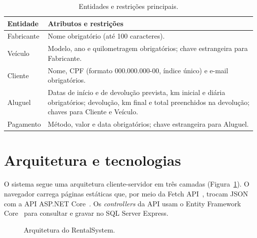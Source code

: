 \documentclass[12pt]{article}
\begin{document}
\begin{table}[htbp]
\centering
\caption{Entidades e restrições principais.}
\label{tab:entidades}
\small
\begin{tabularx}{\linewidth}{@{}lX@{}}
\toprule
\textbf{Entidade} & \textbf{Atributos e restrições} \\
\midrule
Fabricante & Nome obrigatório (até 100 caracteres). \\
Veículo & Modelo, ano e quilometragem obrigatórios; chave estrangeira para Fabricante. \\
Cliente & Nome, CPF (formato 000.000.000-00, índice único) e e-mail obrigatórios. \\
Aluguel & Datas de início e de devolução prevista, km inicial e diária obrigatórios; devolução, km final e total preenchidos na devolução; chaves para Cliente e Veículo. \\
Pagamento & Método, valor e data obrigatórios; chave estrangeira para Aluguel. \\
\bottomrule
\end{tabularx}
\end{table}

\section{Arquitetura e tecnologias}
\label{sec:arquitetura}

O sistema segue uma arquitetura cliente-servidor em três camadas (Figura~\ref{fig:arquitetura}).
O navegador carrega páginas estáticas que, por meio da Fetch API~\cite{mdn-fetch}, trocam JSON com
a API ASP.NET Core~\cite{ms-aspnet}. Os \emph{controllers} da API usam o Entity Framework
Core~\cite{ms-efcore} para consultar e gravar no SQL Server Express.

\begin{figure}[htbp]
\centering
{}
\caption{Arquitetura do RentalSystem.}
\label{fig:arquitetura}
\end{figure}
\end{document}
